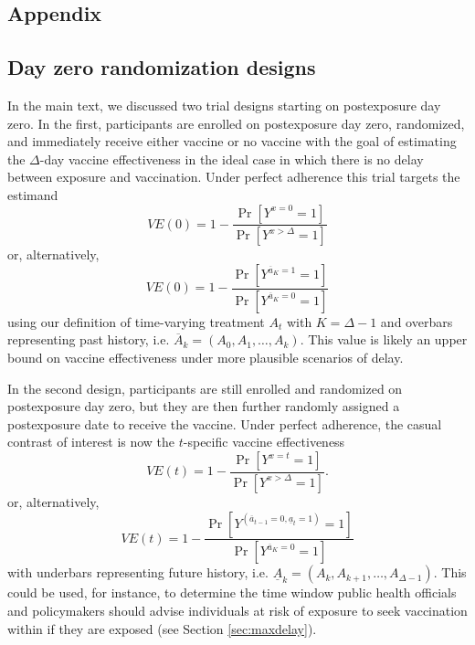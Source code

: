 \renewcommand{\appendixpagename}{\vspace*{\fill}\centering \textit{Web Appendix:} Defining and emulating target trials of the effects of postexposure vaccination using observational data\vspace*{\fill} } %

\begin{appendices}

    \renewcommand{\thefigure}{A\arabic{figure}}
    \setcounter{figure}{0}
    
    \renewcommand{\thetable}{A\arabic{table}}
    \setcounter{table}{0}
    
    \renewcommand{\theequation}{A\arabic{equation}}
    \setcounter{equation}{0}

    \newpage

    \section{Appendix}
    \begin{refsection}  
    \subsection{Day zero randomization designs} \label{sec:dayzero}
    In the main text, we discussed two trial designs starting on postexposure day zero. In the first, participants are enrolled on postexposure day zero, randomized, and immediately receive either vaccine or no vaccine with the goal of estimating the $\Delta$-day vaccine effectiveness in the ideal case in which there is no delay between exposure and vaccination. Under perfect adherence this trial targets the estimand
    $$VE(0) = 1 - \dfrac{\Pr[Y^{x = 0} = 1]}{\Pr[Y^{x > \Delta} = 1]}$$
    or, alternatively,
    $$VE(0) = 1 - \dfrac{\Pr[Y^{\overline{a}_{K} = 1} = 1]}{\Pr[Y^{\overline{a}_{K} = 0} = 1]}$$
    using our definition of time-varying treatment $A_t$ with $K = \Delta - 1$ and overbars representing past history, i.e. $\overline{A}_k = (A_0, A_1, \ldots, A_k)$. This value is likely an upper bound on vaccine effectiveness under more plausible scenarios of delay.

    In the second design, participants are still enrolled and randomized on postexposure day zero, but they are then further randomly assigned a postexposure date to receive the vaccine.  Under perfect adherence, the casual contrast of interest is now the $t$-specific vaccine effectiveness
    $$VE(t) = 1 - \frac{\Pr[Y^{x = t} = 1]}{\Pr[Y^{x > \Delta} = 1]}.$$
    or, alternatively,
    $$VE(t) = 1 - \dfrac{\Pr[Y^{(\overline{a}_{t-1}=0, \underline{a}_{t} = 1)} = 1]}{\Pr[Y^{\overline{a}_{K} = 0} = 1]}$$
    with underbars representing future history, i.e. $\underline{A}_k = (A_k, A_{k+1}, \ldots, A_{\Delta - 1})$. This could be used, for instance, to determine the time window public health officials and policymakers should advise individuals at risk of exposure to seek vaccination within if they are exposed (see Section \ref{sec:maxdelay}).
    \clearpage

\end{refsection}
\end{appendices}

